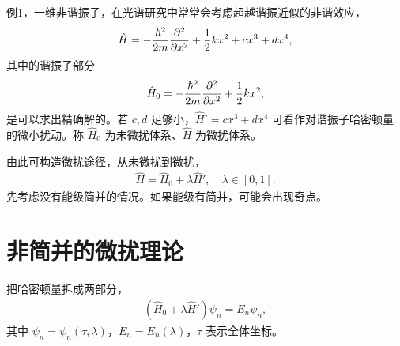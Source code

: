 例1，一维非谐振子，在光谱研究中常常会考虑超越谐振近似的非谐效应，
\begin{align}
    \hat H = -\frac{\hbar^2}{2m} \pdv[2]{x} + \frac12 kx^2 + cx^3 + dx^4,
\end{align}
其中的谐振子部分
\begin{align}
    \hat H_0 = -\frac{\hbar^2}{2m} \pdv[2]{x} + \frac12 kx^2, 
\end{align}
是可以求出精确解的。若 $c,d$ 足够小，$\hat H' = cx^3 + dx^4$ 可看作对谐振子哈密顿量的微小扰动。称 $\hat H_0$ 为未微扰体系、$\hat H$ 为微扰体系。

由此可构造微扰途径，从未微扰到微扰，
\begin{align}
    \hat H = \hat H_0 + \lambda \hat H', \quad \lambda\in[0,1]. 
\end{align}
先考虑没有能级简并的情况。如果能级有简并，可能会出现奇点。

\section{非简并的微扰理论}
把哈密顿量拆成两部分，
\begin{align}
    (\hat H_0 + \lambda \hat H') \psi_n = E_n \psi_n, 
    \label{eq:perb_bb_1}
\end{align}
其中 $\psi_n = \psi_n(\tau, \lambda)$，$E_n = E_n(\lambda)$，$\tau$ 表示全体坐标。 

